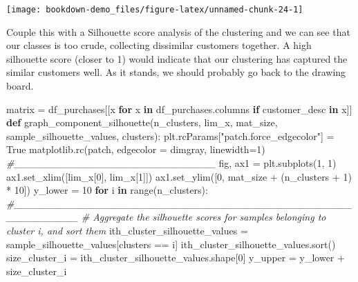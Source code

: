 \documentclass[]{tufte-book}
\newenvironment{Shaded}{}{}
\newcommand{\BuiltInTok}[1]{#1}
\newcommand{\CommentTok}[1]{\textcolor[rgb]{0.38,0.63,0.69}{\textit{#1}}}
\newcommand{\ControlFlowTok}[1]{\textcolor[rgb]{0.00,0.44,0.13}{\textbf{#1}}}
\newcommand{\DecValTok}[1]{\textcolor[rgb]{0.25,0.63,0.44}{#1}}
\newcommand{\KeywordTok}[1]{\textcolor[rgb]{0.00,0.44,0.13}{\textbf{#1}}}
\newcommand{\NormalTok}[1]{#1}
\newcommand{\OperatorTok}[1]{\textcolor[rgb]{0.40,0.40,0.40}{#1}}
\newcommand{\StringTok}[1]{\textcolor[rgb]{0.25,0.44,0.63}{#1}}
\newcommand{\VariableTok}[1]{\textcolor[rgb]{0.10,0.09,0.49}{#1}}
\theoremstyle{definition}
\theoremstyle{definition}
\theoremstyle{definition}
\theoremstyle{remark}
\begin{document}
\texttt{[image: bookdown-demo\_files/figure-latex/unnamed-chunk-24-1]}

Couple this with a Silhouette score analysis of the clustering and we can see that our classes is too crude, collecting dissimilar customers together. A high silhouette score (closer to 1) would indicate that our clustering has captured the similar customers well. As it stands, we should probably go back to the drawing board.

\begin{Shaded}
\begin{Highlighting}[]
\NormalTok{matrix }\OperatorTok{=}\NormalTok{ df\_purchases[[x }\ControlFlowTok{for}\NormalTok{ x }\KeywordTok{in}\NormalTok{ df\_purchases.columns }
\ControlFlowTok{if} \StringTok{\textquotesingle{}customer\_desc\textquotesingle{}} \KeywordTok{in}\NormalTok{ x]]}
\KeywordTok{def}\NormalTok{ graph\_component\_silhouette(n\_clusters, lim\_x, mat\_size, sample\_silhouette\_values, clusters):}
\NormalTok{    plt.rcParams[}\StringTok{"patch.force\_edgecolor"}\NormalTok{] }\OperatorTok{=} \VariableTok{True}
\NormalTok{    matplotlib.rc(}\StringTok{\textquotesingle{}patch\textquotesingle{}}\NormalTok{, edgecolor }\OperatorTok{=} \StringTok{\textquotesingle{}dimgray\textquotesingle{}}\NormalTok{, linewidth}\OperatorTok{=}\DecValTok{1}\NormalTok{)}
    \CommentTok{\#\_\_\_\_\_\_\_\_\_\_\_\_\_\_\_\_\_\_\_\_\_\_\_\_\_\_\_\_}
\NormalTok{    fig, ax1 }\OperatorTok{=}\NormalTok{ plt.subplots(}\DecValTok{1}\NormalTok{, }\DecValTok{1}\NormalTok{)}
\NormalTok{    ax1.set\_xlim([lim\_x[}\DecValTok{0}\NormalTok{], lim\_x[}\DecValTok{1}\NormalTok{]])}
\NormalTok{    ax1.set\_ylim([}\DecValTok{0}\NormalTok{, mat\_size }\OperatorTok{+}\NormalTok{ (n\_clusters }\OperatorTok{+} \DecValTok{1}\NormalTok{) }\OperatorTok{*} \DecValTok{10}\NormalTok{])}
\NormalTok{    y\_lower }\OperatorTok{=} \DecValTok{10}
    \ControlFlowTok{for}\NormalTok{ i }\KeywordTok{in} \BuiltInTok{range}\NormalTok{(n\_clusters):}
        \CommentTok{\#\_\_\_\_\_\_\_\_\_\_\_\_\_\_\_\_\_\_\_\_\_\_\_\_\_\_\_\_\_\_\_\_\_\_\_\_\_\_\_\_\_\_\_\_\_\_\_\_\_\_\_\_\_\_\_\_\_}
        \CommentTok{\# Aggregate the silhouette scores for samples belonging to cluster i, and sort them}
\NormalTok{        ith\_cluster\_silhouette\_values }\OperatorTok{=}\NormalTok{ sample\_silhouette\_values[clusters }\OperatorTok{==}\NormalTok{ i]}
\NormalTok{        ith\_cluster\_silhouette\_values.sort()}
\NormalTok{        size\_cluster\_i }\OperatorTok{=}\NormalTok{ ith\_cluster\_silhouette\_values.shape[}\DecValTok{0}\NormalTok{]}
\NormalTok{        y\_upper }\OperatorTok{=}\NormalTok{ y\_lower }\OperatorTok{+}\NormalTok{ size\_cluster\_i}

\end{Highlighting}
\end{Shaded}
\end{document}
